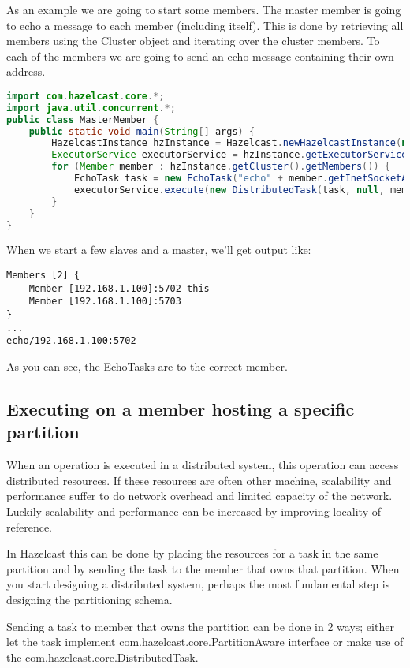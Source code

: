 As an example we are going to start some members. The master member is going to echo a message to each member (including itself). This is done by retrieving all members using the Cluster object and iterating over the cluster members. To each of the members we are going to send an echo message containing their own address. 
\begin{lstlisting}[language=java]
import com.hazelcast.core.*;
import java.util.concurrent.*;
public class MasterMember {
    public static void main(String[] args) {
        HazelcastInstance hzInstance = Hazelcast.newHazelcastInstance(null);
        ExecutorService executorService = hzInstance.getExecutorService();
        for (Member member : hzInstance.getCluster().getMembers()) {
            EchoTask task = new EchoTask("echo" + member.getInetSocketAddress());
            executorService.execute(new DistributedTask(task, null, member));
        }
    }
}
\end{lstlisting}
When we start a few slaves and a master, we'll get output like:
\begin{lstlisting}
Members [2] {
	Member [192.168.1.100]:5702 this
	Member [192.168.1.100]:5703
}
...
echo/192.168.1.100:5702
\end{lstlisting}
As you can see, the EchoTasks are to the correct member.

\subsection{Executing on a member hosting a specific partition}
When an operation is executed in a distributed system, this operation can access distributed resources. If these resources are often other machine, scalability and performance suffer to do network overhead and limited capacity of the network. Luckily scalability and performance can be increased by improving locality of reference.

In Hazelcast this can be done by placing the resources for a task in the same partition and by sending the task to the member that owns that partition. When you start designing a distributed system, perhaps the most fundamental step is designing the partitioning schema.

Sending a task to member that owns the partition can be done in 2 ways; either let the task implement com.hazelcast.core.PartitionAware interface or make use of the com.hazelcast.core.DistributedTask.

